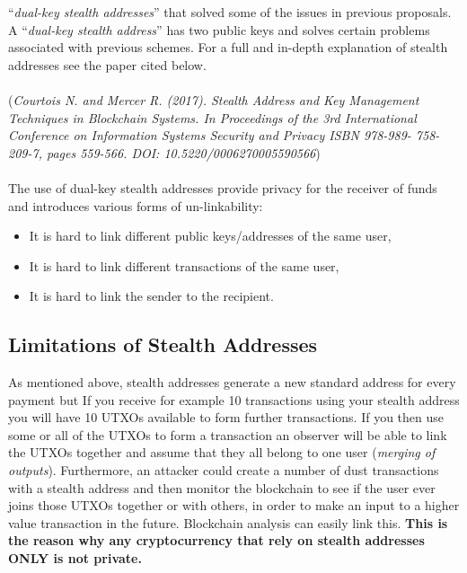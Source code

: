 “\textit{dual-key stealth addresses}” that solved some of the issues in 
previous proposals. A “\textit{dual-key stealth address}” has two public 
keys and solves certain problems associated with previous schemes. For a 
full and in-depth explanation of stealth addresses see the paper cited below.
\\
\\
\noindent
(\textit{Courtois N. and Mercer R. (2017). Stealth Address and Key Management
Techniques in Blockchain Systems. In Proceedings of the 3rd International
Conference on Information Systems Security and Privacy ISBN 978-989-
758-209-7, pages 559-566. DOI: 10.5220/0006270005590566})
\\
\\
\noindent
The use of dual-key stealth addresses provide privacy for the receiver of
funds and introduces various forms of un-linkability:

\begin{itemize}
	\item It is hard to	link different public keys/addresses of the same user,
	\item It is hard to	link different transactions of the same user,
	\item It is hard to link the sender to the recipient.
\end{itemize}

\subsection{Limitations of Stealth Addresses}
As mentioned above, stealth addresses generate a new standard address for
every payment but If you receive for example 10 transactions using your
stealth address you will have 10 UTXOs available to form further
transactions. If you then use some or all of the UTXOs to form a transaction
an observer will be able to link the UTXOs together and assume that they all
belong to one user (\textit{merging of outputs}). Furthermore, an attacker could
create a number of dust transactions with a stealth address and then monitor
the blockchain to see if the user ever joins those UTXOs together or with
others, in order to make an input to a higher value transaction in the future.
Blockchain analysis can easily link this. \textbf{This is the reason why any
cryptocurrency that rely on stealth addresses ONLY is not private.}
\newpage

